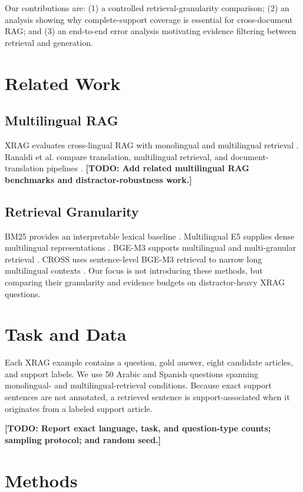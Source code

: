 \documentclass[11pt]{article}
\begin{document}
Our contributions are: (1) a controlled retrieval-granularity comparison; (2) an analysis showing why complete-support coverage is essential for cross-document RAG; and (3) an end-to-end error analysis motivating evidence filtering between retrieval and generation.

\section{Related Work}
\subsection{Multilingual RAG}
XRAG evaluates cross-lingual RAG with monolingual and multilingual retrieval \citep{liu2025xrag}. Ranaldi et al. compare translation, multilingual retrieval, and document-translation pipelines \citep{ranaldi2026multilingual}. \textbf{[TODO: Add related multilingual RAG benchmarks and distractor-robustness work.]}

\subsection{Retrieval Granularity}
BM25 provides an interpretable lexical baseline \citep{robertson2009bm25}. Multilingual E5 supplies dense multilingual representations \citep{wang2024multilingual}. BGE-M3 supports multilingual and multi-granular retrieval \citep{chen2024m3}. CROSS uses sentence-level BGE-M3 retrieval to narrow long multilingual contexts \citep{bagheri2026cross}. Our focus is not introducing these methods, but comparing their granularity and evidence budgets on distractor-heavy XRAG questions.

\section{Task and Data}
Each XRAG example contains a question, gold answer, eight candidate articles, and support labels. We use 50 Arabic and Spanish questions spanning monolingual- and multilingual-retrieval conditions. Because exact support sentences are not annotated, a retrieved sentence is support-associated when it originates from a labeled support article.

\textbf{[TODO: Report exact language, task, and question-type counts; sampling protocol; and random seed.]}

\section{Methods}
\end{document}

